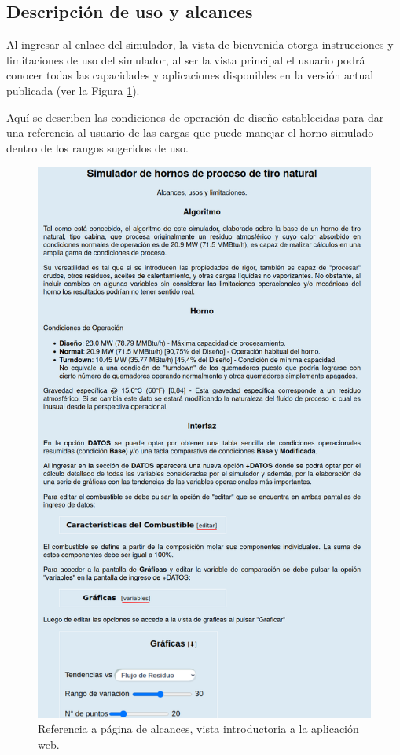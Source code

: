 \subsection{Descripción de uso y alcances}
\par Al ingresar al enlace del simulador, la vista de bienvenida otorga instrucciones y limitaciones de uso del simulador, al ser la vista principal el usuario podrá conocer todas las capacidades y aplicaciones disponibles en la versión actual publicada (ver la Figura \ref{fig:alcance}).
\par Aquí se describen las condiciones de operación de diseño establecidas para dar una referencia al usuario de las cargas que puede manejar el horno simulado dentro de los rangos sugeridos de uso.
\begin{figure}[H]
\begin{center}
\includegraphics[scale=0.33]{images/alcance}
\caption[Página de alcances]{Referencia a página de alcances, vista introductoria a la aplicación web.}
\label{fig:alcance}
\end{center}
\end{figure}
